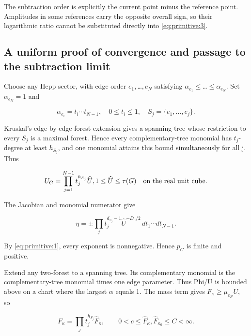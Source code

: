 \documentclass[11pt,a4paper,oneside]{article}
\theoremstyle{plain}
\theoremstyle{definition}
\theoremstyle{remark}
\numberwithin{equation}{section}
\begin{document}
The subtraction order is explicitly the current point minus the reference point. Amplitudes in some references carry the opposite overall sign, so their logarithmic ratio cannot be substituted directly into \eqref{eq:primitive:3}.


\subsection{A uniform proof of convergence and passage to the subtraction limit}\label{sec:primitive:2}

Choose any Hepp sector, with edge order \(e_1,\)\ldots{}\(,e_N\) satisfying \(\alpha _{e_1}\le \)\ldots{}\(\le \alpha _{e_N}\). Set \(\alpha _{e_N}=1\) and

\begin{equation}
\alpha_{e_i}=t_i\cdots t_{N-1},\quad 0\le t_i\le1,\quad
 S_j=\{e_1,\ldots,e_j\}.                                        \label{eq:primitive:4}
\end{equation}

Kruskal's edge-by-edge forest extension gives a spanning tree whose restriction to every \(S_j\) is a maximal forest. Hence every complementary-tree monomial has \(t_j\)-degree at least \(h_{S_j}\), and one monomial attains this bound simultaneously for all j. Thus

\begin{equation}
U_G=\prod_{j=1}^{N-1}t_j^{h_{S_j}}\widehat U,
             1\le\widehat U\le\tau(G)\quad\hbox{on the real unit cube}.           \label{eq:primitive:5}
\end{equation}

The Jacobian and monomial numerator give

\begin{equation}
\eta=\pm\prod_jt_j^{d_{S_j}-1}\widehat U^{-D_0/2}\,dt_1\cdots dt_{N-1}.
                                                                    \label{eq:primitive:6}
\end{equation}

By \eqref{eq:primitive:1}, every exponent is nonnegative. Hence \(p_G\) is finite and positive.

Extend any two-forest to a spanning tree. Its complementary monomial is the complementary-tree monomial times one edge parameter. Thus Phi/U is bounded above on a chart where the largest \(\alpha \) equals 1. The mass term gives \(F_\kappa \ge \mu _{e_N}U\), so

\begin{equation}
F_\kappa=\prod_jt_j^{h_{S_j}}\widehat F_\kappa,\qquad
       0<c\le\widehat F_\kappa,\widehat F_{\kappa_0}\le C<\infty.             \label{eq:primitive:7}
\end{equation}
\end{document}
